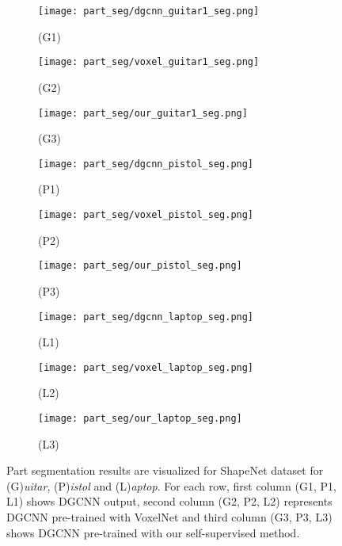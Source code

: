 \documentclass{article}
\begin{document}
\begin{figure}
    \centering

	\begin{subfigure}{.32\textwidth}
		\centering
		\texttt{[image: part\_seg/dgcnn\_guitar1\_seg.png]}
		\caption*{(G1)}
		\label{fig:seg22}
    \end{subfigure}\begin{subfigure}{.32\textwidth}
		\centering
		\texttt{[image: part\_seg/voxel\_guitar1\_seg.png]}
		\caption*{(G2)}
		\label{fig:seg23}
    \end{subfigure}\begin{subfigure}{.32\textwidth}
		\centering
		\texttt{[image: part\_seg/our\_guitar1\_seg.png]}
		\caption*{(G3)}
		\label{fig:seg24}
	\end{subfigure}
		\begin{subfigure}{.32\textwidth}
		\centering
		\texttt{[image: part\_seg/dgcnn\_pistol\_seg.png]}
		\caption*{(P1)}
		\label{fig:seg25}
    \end{subfigure}\begin{subfigure}{.32\textwidth}
		\centering
		\texttt{[image: part\_seg/voxel\_pistol\_seg.png]}
		\caption*{(P2)}
		\label{fig:seg26}
    \end{subfigure}\begin{subfigure}{.32\textwidth}
		\centering
		\texttt{[image: part\_seg/our\_pistol\_seg.png]}
		\caption*{(P3)}
		\label{fig:seg27}
	\end{subfigure}
			\begin{subfigure}{.32\textwidth}
		\centering
		\texttt{[image: part\_seg/dgcnn\_laptop\_seg.png]}
		\caption*{(L1)}
		\label{fig:seg28}
    \end{subfigure}\begin{subfigure}{.32\textwidth}
		\centering
		\texttt{[image: part\_seg/voxel\_laptop\_seg.png]}
		\caption*{(L2)}
		\label{fig:seg29}
    \end{subfigure}\begin{subfigure}{.32\textwidth}
		\centering
		\texttt{[image: part\_seg/our\_laptop\_seg.png]}
		\caption*{(L3)}
		\label{fig:seg30}
	\end{subfigure}\caption{Part segmentation results are visualized for ShapeNet dataset for (G)\emph{uitar}, (P)\emph{istol} and (L)\emph{aptop}. For each row, first column (G1, P1, L1) shows DGCNN output, second column (G2, P2, L2) represents DGCNN pre-trained with VoxelNet and third column (G3, P3, L3) shows DGCNN pre-trained with our self-supervised method.}
	\label{fig:partseg1}
\end{figure}
\end{document}
